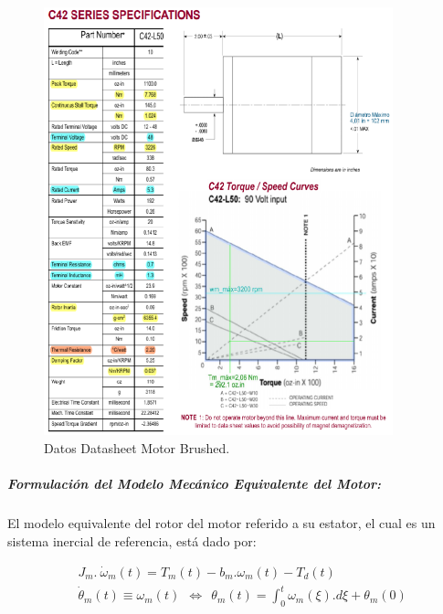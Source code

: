 \documentclass{article}
\begin{document}
\begin{sloppypar}
\begin{figure}[H]
    \centering
    \includegraphics[width=0.9\textwidth]{Datos Datasheet Motor Brushed}
    \caption{Datos Datasheet Motor Brushed.}
    \label{fig:Datos Datasheet Motor Brushed}
\end{figure}




\subparagraph{Formulación del Modelo Mecánico Equivalente del Motor:}
\label{sec:Formulación del Modelo Mecánico Equivalente del Motor:}
\hfill

\hfill

El modelo equivalente del rotor del motor referido a su estator, el cual es un sistema inercial de referencia, está dado por:

\begin{subequations} \label{eq:J_m y theta_m}
    \begin{align}
        & \label{eq:J_m}   J_m.\ {\dot{\omega}}_m\left(t\right)=T_m\left(t\right)-b_m.\omega_m(t)-T_d(t)
        \\
        & \label{eq:theta_m}   {\dot{\theta}}_m\left(t\right)\equiv\omega_m\left(t\right)\ \ \Leftrightarrow{\ \ \theta}_m\left(t\right)=\int_{0}^{t}{\omega_m\left(\xi\right).d\xi}+\theta_m\left(0\right)
    \end{align}
\end{subequations}


\end{sloppypar}
\end{document}
